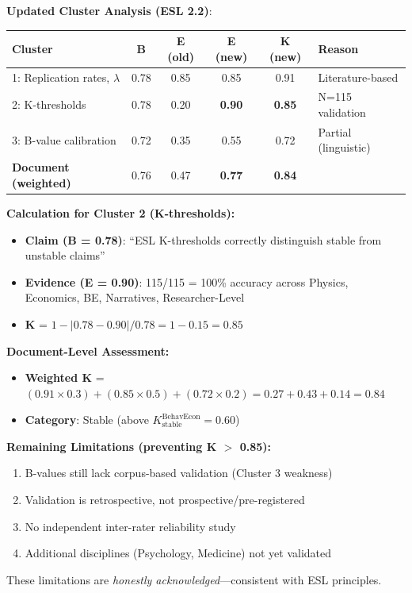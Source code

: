 \documentclass[11pt,a4paper]{article}
\begin{document}
\textbf{Updated Cluster Analysis (ESL 2.2)}:

\begin{table}[h]
\centering
\begin{tabular}{lccccl}
\toprule
\textbf{Cluster} & \textbf{B} & \textbf{E (old)} & \textbf{E (new)} & \textbf{K (new)} & \textbf{Reason} \\
\midrule
1: Replication rates, $\lambda$ & 0.78 & 0.85 & 0.85 & 0.91 & Literature-based \\
2: K-thresholds & 0.78 & 0.20 & \textbf{0.90} & \textbf{0.85} & N=115 validation \\
3: B-value calibration & 0.72 & 0.35 & 0.55 & 0.72 & Partial (linguistic) \\
\midrule
\textbf{Document (weighted)} & 0.76 & 0.47 & \textbf{0.77} & \textbf{0.84} & \\
\bottomrule
\end{tabular}
\end{table}

\textbf{Calculation for Cluster 2 (K-thresholds):}
\begin{itemize}
    \item \textbf{Claim (B = 0.78)}: ``ESL K-thresholds correctly distinguish stable from unstable claims''
    \item \textbf{Evidence (E = 0.90)}: 115/115 = 100\% accuracy across Physics, Economics, BE, Narratives, Researcher-Level
    \item \textbf{K} = $1 - |0.78 - 0.90| / 0.78 = 1 - 0.15 = 0.85$
\end{itemize}

\textbf{Document-Level Assessment:}
\begin{itemize}
    \item \textbf{Weighted K} = $(0.91 \times 0.3) + (0.85 \times 0.5) + (0.72 \times 0.2) = 0.27 + 0.43 + 0.14 = 0.84$
    \item \textbf{Category}: \textcolor{green!60!black}{Stable} (above $K_{\text{stable}}^{\text{BehavEcon}} = 0.60$)
\end{itemize}

\begin{warningbox}
\textbf{Remaining Limitations (preventing K $>$ 0.85):}
\begin{enumerate}
    \item B-values still lack corpus-based validation (Cluster 3 weakness)
    \item Validation is retrospective, not prospective/pre-registered
    \item No independent inter-rater reliability study
    \item Additional disciplines (Psychology, Medicine) not yet validated
\end{enumerate}
These limitations are \textit{honestly acknowledged}---consistent with ESL principles.
\end{warningbox}
\end{document}
